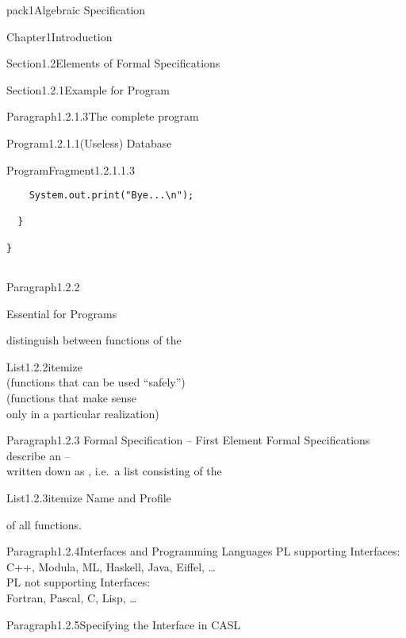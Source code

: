 \documentclass[landscape, slides, light]{mmiss2}
\begin{document}
\begin{Package}{pack1}{Algebraic
Specification}
\begin{Section}{Chapter1}{Introduction}
\begin{Section}{Section1.2}{Elements of Formal Specifications}{}
\begin{Section}{Section1.2.1}{Example for Program}{}
\begin{Paragraph}{Paragraph1.2.1.3}{The complete program}{}
\begin{Program}{Program1.2.1.1}{(Useless) Database}{}
\begin{ProgramFragment}{ProgramFragment1.2.1.1.3}{}{}
\begin{verbatim}
    System.out.print("Bye...\n");

  }

}


\end{verbatim}
\normalsize
\end{ProgramFragment}
\end{Program}
\end{Paragraph}
\end{Section}

\begin{Paragraph}{Paragraph1.2.2}{}{}
\begin{center}
{\Large Essential for Programs}
\end{center}
distinguish between functions of the
\begin{List}{List1.2.2}{itemize}{}
\ListItem{}
{ \\ (functions that can be used
``safely'')}
\ListItem{}
{ \\ (functions that make sense \\
           only in a particular realization)}
\end{List}
\end{Paragraph}

\begin{Paragraph}{Paragraph1.2.3}{ Formal Specification -- First Element}{}
Formal Specifications describe an  -- \\
written down as , i.e.~a list consisting of the\\
\begin{List}{List1.2.3}{itemize}{}
\ListItem{}
{Name and}
\ListItem{}
{Profile}
\end{List}
of all functions.
\end{Paragraph}

\begin{Paragraph}{Paragraph1.2.4}{Interfaces and Programming Languages}{}
PL supporting Interfaces: \\
C++, Modula, ML, Haskell, Java, Eiffel, \dots \\ 
PL not supporting Interfaces: \\
Fortran, Pascal, C, Lisp, \dots
\end{Paragraph}

\begin{Paragraph}{Paragraph1.2.5}{Specifying the Interface in CASL}{}

\vspace{1cm}


\end{Paragraph}
\end{Section}
\end{Section}
\end{Package}
\end{document}
